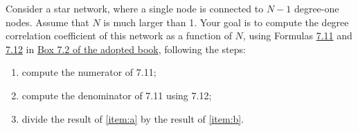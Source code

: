 \documentclass[assignment = 12]{homework}
\begin{document}
    \pagestyle{main}

    Consider a star network, where a single node is connected to $N-1$ degree-one nodes. Assume that $N$ is much larger than 1. Your goal is to compute the degree correlation coefficient of this network as a function of $N$, using Formulas \hyperref[eq:coefficient]{7.11} and \hyperref[eq:variance]{7.12} in \href{http://networksciencebook.com/chapter/7#measuring-degree}{Box 7.2 of the adopted book}, following the steps:

    \begin{enumerate}[label={(\alph*)}]
        \item compute the numerator of 7.11; \label{item:a}
        \item compute the denominator of 7.11 using 7.12; \label{item:b}
        \item divide the result of \ref{item:a} by the result of \ref{item:b}. \label{item:c}
    \end{enumerate}

    
    
    
\end{document}
